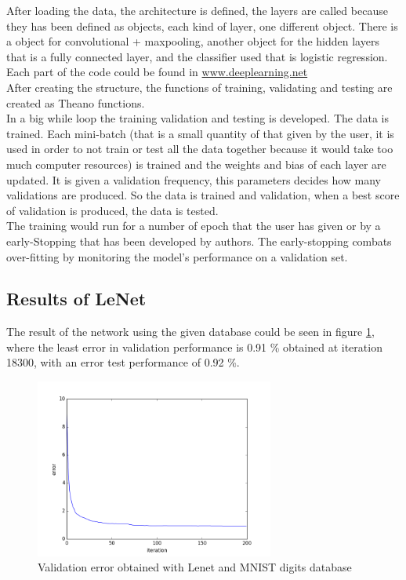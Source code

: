 After loading the data, the architecture is defined, the layers are called because they has been defined as objects, each kind of layer, one different object. There is a object for convolutional + maxpooling, another object for the hidden layers that is a fully connected layer, and the classifier used that is logistic regression. Each part of the code could be found in \url{www.deeplearning.net}\\

After creating the structure, the functions of training, validating and testing are created as Theano functions.\\

In a big while loop the training validation and testing is developed. The data is trained. Each mini-batch (that is a small quantity of that given by the user, it is used in order to not train or test all the data together because it would take too much computer resources) is trained and the weights and bias of each layer are updated. It is given a validation frequency, this parameters decides how many validations are produced. So the data is trained and validation, when a best score of validation is produced, the data is tested.\\

The training would run for a number of epoch that the user has given or by a early-Stopping that has been developed by authors. The early-stopping combats over-fitting by monitoring the model's performance on a validation set.\\

\subsection{Results of LeNet}

The result of the network using the given database could be seen in figure \ref{fig:Lenetresult}, where the least error in validation performance is 0.91 \% obtained at iteration 18300, with an error test performance of 0.92 \%. \\

\begin{figure}[htb]
\centering
\includegraphics[width=0.7\textwidth]{images/ModificandoLenet/error_lenet.png}
\caption{Validation error obtained with Lenet and MNIST digits database} \label{fig:Lenetresult}
\end{figure}


